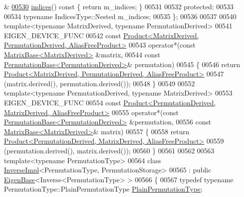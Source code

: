 \begin{DoxyCode}
      &
\hyperlink{group___core___module_a88ae93cc14c136b2eec4a286b4c10c34}{00530}     \hyperlink{group___core___module_a88ae93cc14c136b2eec4a286b4c10c34}{indices}()\textcolor{keyword}{ const }\{ \textcolor{keywordflow}{return} m\_indices; \}
00531 
00532   \textcolor{keyword}{protected}:
00533 
00534     \textcolor{keyword}{typename} IndicesType::Nested m\_indices;
00535 \};
00536 
00537 
00540 \textcolor{keyword}{template}<\textcolor{keyword}{typename} MatrixDerived, \textcolor{keyword}{typename} PermutationDerived>
00541 EIGEN\_DEVICE\_FUNC
00542 \textcolor{keyword}{const} \hyperlink{group___core___module_class_eigen_1_1_product}{Product<MatrixDerived, PermutationDerived, AliasFreeProduct>}
00543 operator*(\textcolor{keyword}{const} \hyperlink{group___core___module_class_eigen_1_1_matrix_base}{MatrixBase<MatrixDerived>} &matrix,
00544           \textcolor{keyword}{const} \hyperlink{group___core___module_class_eigen_1_1_permutation_base}{PermutationBase<PermutationDerived>}& permutation)
00545 \{
00546   \textcolor{keywordflow}{return} \hyperlink{group___core___module_class_eigen_1_1_product}{Product<MatrixDerived, PermutationDerived, AliasFreeProduct>}
00547             (matrix.derived(), permutation.derived());
00548 \}
00549 
00552 \textcolor{keyword}{template}<\textcolor{keyword}{typename} PermutationDerived, \textcolor{keyword}{typename} MatrixDerived>
00553 EIGEN\_DEVICE\_FUNC
00554 \textcolor{keyword}{const} \hyperlink{group___core___module_class_eigen_1_1_product}{Product<PermutationDerived, MatrixDerived, AliasFreeProduct>}
00555 operator*(\textcolor{keyword}{const} \hyperlink{group___core___module_class_eigen_1_1_permutation_base}{PermutationBase<PermutationDerived>} &permutation,
00556           \textcolor{keyword}{const} \hyperlink{group___core___module_class_eigen_1_1_matrix_base}{MatrixBase<MatrixDerived>}& matrix)
00557 \{
00558   \textcolor{keywordflow}{return} \hyperlink{group___core___module_class_eigen_1_1_product}{Product<PermutationDerived, MatrixDerived, AliasFreeProduct>}
00559             (permutation.derived(), matrix.derived());
00560 \}
00561 
00562 
00563 \textcolor{keyword}{template}<\textcolor{keyword}{typename} PermutationType>
00564 \textcolor{keyword}{class }\hyperlink{class_eigen_1_1_inverse_impl}{InverseImpl}<PermutationType, PermutationStorage>
00565   : \textcolor{keyword}{public} \hyperlink{group___core___module_struct_eigen_1_1_eigen_base}{EigenBase}<Inverse<PermutationType> >
00566 \{
00567     \textcolor{keyword}{typedef} \textcolor{keyword}{typename} PermutationType::PlainPermutationType \hyperlink{group___core___module_class_eigen_1_1_permutation_matrix}{PlainPermutationType};

\end{DoxyCode}
